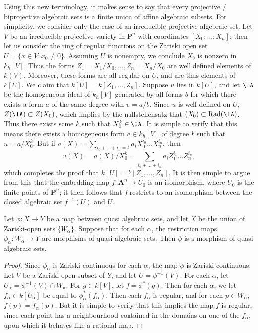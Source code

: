 \begin{example}
    Using this new terminology, it makes sense to say that every projective / biprojective algebraic sets is a finite union of affine algebraic subsets. For simplicity, we consider only the case of an irreducible projective algebraic set. Let $V$ be an irreducible projective variety in $\mathbf{P}^n$ with coordinates $[X_0:\dots:X_n]$; then let us consider the ring of regular functions on the Zariski open set $U = \{ x \in V : x_0 \neq 0 \}$. Assuming $U$ is nonempty, we conclude $X_0$ is nonzero in $k_h[V]$. Thus the forms $Z_1 = X_1/X_0,\dots, Z_n = X_n/X_0$ are well defined elements of $k(V)$. Moreover, these forms are all regular on $U$, and are thus elements of $k[U]$. We claim that $k[U] = k[Z_1,\dots,Z_n]$. Suppose $u$ lies in $k[U]$, and let $\IA$ be the homogeneous ideal of $k_h[V]$ generated by all forms $b$ for which there exists a form $a$ of the same degree with $u = a/b$. Since $u$ is well defined on $U$, $Z(\IA) \subset Z(X_0)$, which implies by the nullstellensatz that $(X_0) \subset \text{Rad}(\IA)$. Thus there exists some $k$ such that $X_0^k \in \IA$. It is simple to verify that this means there exists a homogeneous form $a \in k_h[V]$ of degree $k$ such that $u = a/X_0^k$. But if $a(X) = \sum_{i_0 + \dots + i_n = k} a_i X_0^{i_0} \dots X_n^{i_n}$, then
    \[ u(X) = a(X)/X_0^k = \sum_{i_0 + \dots + i_n} a_i Z_1^{i_1} \dots Z_n^{i_n}, \]
    which completes the proof that $k[U] = k[Z_1,\dots,Z_n]$. It is then simple to argue from this that the embedding map $f: \mathbf{A}^n \to U_0$ is an isomorphism, where $U_0$ is the finite points of $\mathbf{P}^n$; it then follows that $f$ restricts to an isomorphism between the closed algebraic set $f^{-1}(U)$ and $U$.
\end{example}

\begin{theorem}
    Let $\phi: X \to Y$ be a map between quasi algebraic sets, and let $X$ be the union of Zariski-open sets $\{ W_\alpha \}$. Suppose that for each $\alpha$, the restriction maps $\phi_\alpha: W_\alpha \to Y$ are morphisms of quasi algebraic sets. Then $\phi$ is a morphism of quasi algebraic sets.
\end{theorem}
\begin{proof}
    Since $\phi_\alpha$ is Zariski continuous for each $\alpha$, the map $\phi$ is Zariski continuous. Let $V$ be a Zariski open subset of $Y$, and let $U = \phi^{-1}(V)$. For each $\alpha$, let $U_\alpha = \phi^{-1}(V) \cap W_\alpha$. For $g \in k[V]$, let $f = \phi^*(g)$. Then for each $\alpha$, we let $f_\alpha \in k[U_\alpha]$ be equal to $\phi_\alpha^*(f_\alpha)$. Then each $f_\alpha$ is regular, and for each $p \in W_\alpha$, $f(p) = f_\alpha(p)$. But it is simple to verify that this implies the map $f$ is regular, since each point has a neighbourhood contained in the domains on one of the $f_\alpha$, upon which it behaves like a rational map.
\end{proof}

